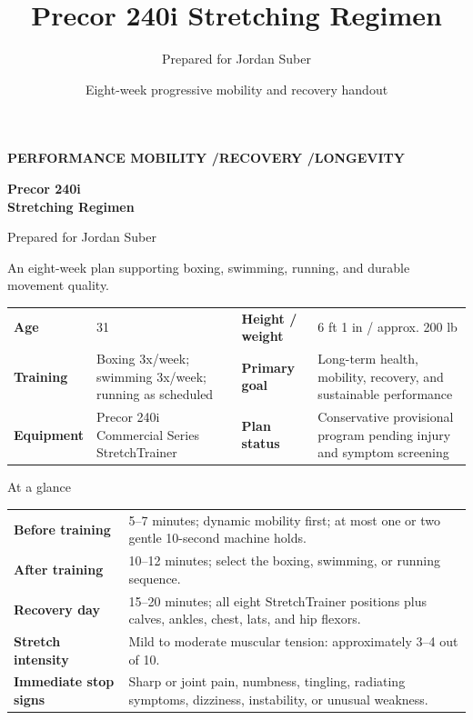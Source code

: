 \documentclass[10pt,letterpaper]{article}
\title{\vspace{-2.5em}\textbf{Precor 240i Stretching Regimen}}
\author{Prepared for Jordan Suber}
\date{Eight-week progressive mobility and recovery handout}
\begin{document}
\hypersetup{pageanchor=false}

\begin{titlepage}
\thispagestyle{empty}

\begin{tcolorbox}[
  enhanced,
  colback=Midnight,
  colframe=Midnight,
  arc=3mm,
  boxrule=0pt,
  left=7mm,right=7mm,top=8mm,bottom=8mm
]
{\color{Gold}\bfseries\small PERFORMANCE MOBILITY \enspace/\enspace RECOVERY \enspace/\enspace LONGEVITY}

\vspace{4mm}
{\color{white}\fontsize{26}{30}\selectfont\bfseries Precor 240i\\Stretching Regimen}

\vspace{3mm}
{\color{Aqua}\Large Prepared for Jordan Suber}

\vspace{5mm}
{\color{white}\normalsize An eight-week plan supporting boxing, swimming, running, and durable movement quality.}
\end{tcolorbox}

\vspace{4mm}

\begin{tabularx}{\textwidth}{@{}>{}L{1.18in}Y >{}L{1.18in}Y@{}}
\textbf{Age} & 31 & \textbf{Height / weight} & 6 ft 1 in / approx. 200 lb \\
\textbf{Training} & Boxing 3x/week; swimming 3x/week; running as scheduled & \textbf{Primary goal} & Long-term health, mobility, recovery, and sustainable performance \\
\textbf{Equipment} & Precor 240i Commercial Series StretchTrainer & \textbf{Plan status} & Conservative provisional program pending injury and symptom screening \\
\end{tabularx}

\vspace{5mm}

\begin{callout}{At a glance}
\begin{tabularx}{\textwidth}{@{}L{1.55in}Y@{}}
\textbf{Before training} & 5--7 minutes; dynamic mobility first; at most one or two gentle 10-second machine holds. \\
\textbf{After training} & 10--12 minutes; select the boxing, swimming, or running sequence. \\
\textbf{Recovery day} & 15--20 minutes; all eight StretchTrainer positions plus calves, ankles, chest, lats, and hip flexors. \\
\textbf{Stretch intensity} & Mild to moderate muscular tension: approximately 3--4 out of 10. \\
\textbf{Immediate stop signs} & Sharp or joint pain, numbness, tingling, radiating symptoms, dizziness, instability, or unusual weakness. \\
\end{tabularx}
\end{callout}


\end{titlepage}
\end{document}
